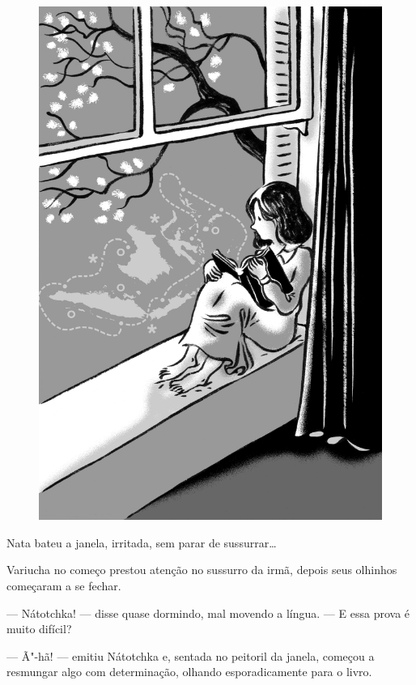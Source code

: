 \begin{figure}%
\vspace*{-2.35cm}
\hspace*{-2.5cm}\includegraphics{./imgs/cena12.jpg}
\end{figure}

Nata bateu a janela, irritada, sem parar de sussurrar\ldots{}

Variucha no começo prestou atenção no sussurro da irmã, depois seus
olhinhos começaram a se fechar.

--- Nátotchka! --- disse quase dormindo, mal movendo a língua. --- E
essa prova é muito difícil?

--- Ã"-hã! --- emitiu Nátotchka e, sentada no peitoril da janela, começou
a resmungar algo com determinação, olhando esporadicamente para o livro.

